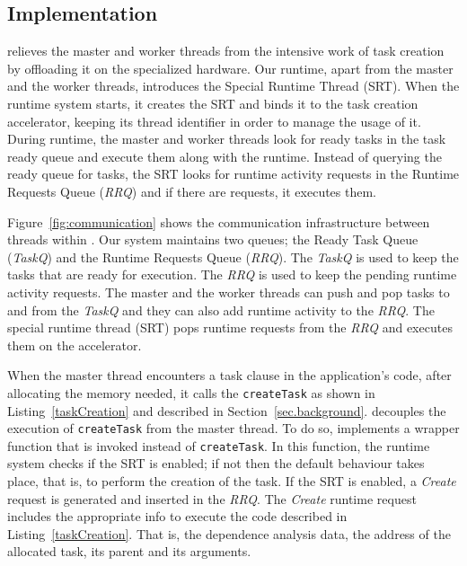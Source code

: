 

\subsection{Implementation}

{\proposal} relieves the master and worker threads from the intensive work of task creation by offloading it on the specialized hardware.
Our runtime, apart from the master and the worker threads, introduces the Special Runtime Thread (SRT). 
When the runtime system starts, it creates the SRT and binds it to the task creation accelerator, keeping its thread identifier in order to manage the usage of it.
During runtime, the master and worker threads look for ready tasks in the task ready queue and execute them along with the runtime.
Instead of querying the ready queue for tasks, the SRT looks for runtime activity requests in the Runtime Requests Queue (\textit{RRQ}) and if there are requests, it executes them.

Figure~\ref{fig:communication} shows the communication infrastructure between threads within {\proposal}.
Our system maintains two queues; the Ready Task Queue (\textit{TaskQ}) and the Runtime Requests Queue (\textit{RRQ}).
The \textit{TaskQ} is used to keep the tasks that are ready for execution. 
The \textit{RRQ} is used to keep the pending runtime activity requests. 
The master and the worker threads can push and pop tasks to and from the \textit{TaskQ} and they can also add runtime activity to the \textit{RRQ}. 
The special runtime thread (SRT) pops runtime requests from the \textit{RRQ} and executes them on the accelerator.

When the master thread encounters a task clause in the application's code, after allocating the memory needed, it calls the \texttt{createTask} as shown in Listing~\ref{taskCreation} and described in Section~\ref{sec.background}. 
{\proposal} decouples the execution of \texttt{createTask} from the master thread. 
To do so, {\proposal} implements a wrapper function that is invoked instead of \texttt{createTask}.
In this function, the runtime system checks if the SRT is enabled; if not then the default behaviour takes place, that is, to perform the creation of the task.
If the SRT is enabled, a \textit{Create} request is generated and inserted in the \textit{RRQ}.
The \textit{Create} runtime request includes the appropriate info to execute the code described in Listing~\ref{taskCreation}.
That is, the dependence analysis data, the address of the allocated task, its parent and its arguments.



